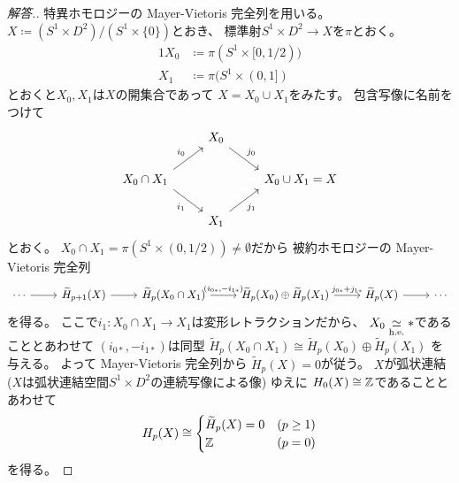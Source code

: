 \documentclass[report]{jlreq}
\begin{document}
\begin{proof}[解答.]
    特異ホモロジーの Mayer-Vietoris 完全列を用いる。
    $X \coloneqq (S^1 \times D^2) / (S^1 \times \{ 0 \})$とおき、
    標準射$S^1 \times D^2 \to X$を$\pi$とおく。
    \begin{alignat}{1}
        X_0 &\coloneqq \pi(S^1 \times [0, 1/2)) \\
        X_1 &\coloneqq \pi(S^1 \times (0, 1])
    \end{alignat}
    とおくと$X_0, X_1$は$X$の開集合であって
    $X = X_0 \cup X_1$をみたす。
    包含写像に名前をつけて
    \begin{equation}
        \begin{tikzcd}
            & X_0
                \ar[end anchor=north west]{rd}{j_0} \\
            X_0 \cap X_1
                \ar[start anchor=north east]{ru}{i_0}
                \ar[start anchor=south east]{rd}[swap]{i_1}
                && X_0 \cup X_1 = X \\
            & X_1
                \ar[end anchor=south west]{ru}[swap]{j_1}
        \end{tikzcd}
    \end{equation}
    とおく。
    $X_0 \cap X_1 = \pi(S^1 \times (0, 1/2)) \neq \emptyset$だから
    被約ホモロジーの Mayer-Vietoris 完全列
    \begin{equation}
        \begin{tikzcd}
            \cdots
                \ar{r}
                & \widetilde{H}_{p + 1}(X)
                    \ar{r}
                & \widetilde{H}_p(X_0 \cap X_1)
                    \ar{r}{(i_{0*}, -i_{1*})}
                & \widetilde{H}_p(X_0) \oplus \widetilde{H}_p(X_1)
                    \ar{r}{j_{0*} + j_{1*}}
                & \widetilde{H}_p(X)
                    \ar{r}
                & \cdots
        \end{tikzcd}
    \end{equation}
    を得る。
    ここで$i_1 \colon X_0 \cap X_1 \to X_1$は変形レトラクションだから、
    $X_0 \simeqhe *$であることとあわせて
    $(i_{0*}, -i_{1*})$は同型
    $\widetilde{H}_p(X_0 \cap X_1)
        \cong \widetilde{H}_p(X_0) \oplus \widetilde{H}_p(X_1)$
    を与える。
    よって Mayer-Vietoris 完全列から
    $\widetilde{H}_p(X) = 0$が従う。
    $X$が弧状連結 (\because $X$は弧状連結空間$S^1 \times D^2$の連続写像による像) ゆえに 
    $H_0(X) \cong \mathbb{Z}$であることとあわせて
    \begin{equation}
        H_p(X) \cong \begin{cases}
            \widetilde{H}_p(X) = 0 & (p \geq 1) \\
            \mathbb{Z} & (p = 0)
        \end{cases}
    \end{equation}
    を得る。
\end{proof}
\end{document}
